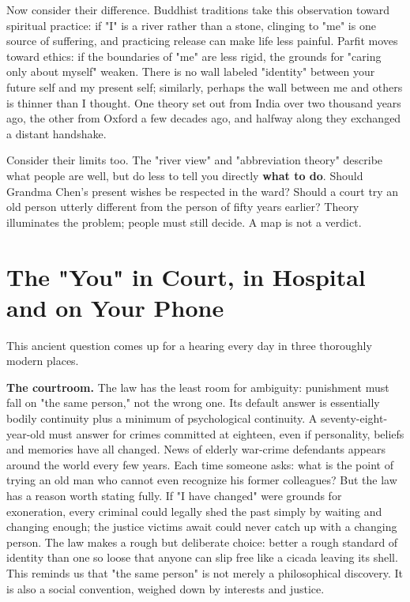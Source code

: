 Now consider their difference. Buddhist traditions take this observation toward spiritual practice: if "I" is a river rather than a stone, clinging to "me" is one source of suffering, and practicing release can make life less painful. Parfit moves toward ethics: if the boundaries of "me" are less rigid, the grounds for "caring only about myself" weaken. There is no wall labeled "identity" between your future self and my present self; similarly, perhaps the wall between me and others is thinner than I thought. One theory set out from India over two thousand years ago, the other from Oxford a few decades ago, and halfway along they exchanged a distant handshake.

Consider their limits too. The "river view" and "abbreviation theory" describe what people are well, but do less to tell you directly \textbf{what to do}. Should Grandma Chen's present wishes be respected in the ward? Should a court try an old person utterly different from the person of fifty years earlier? Theory illuminates the problem; people must still decide. A map is not a verdict.

\section[Yourself in Court, Ward and Phone]{The "You" in Court, in Hospital and on Your Phone}
This ancient question comes up for a hearing every day in three thoroughly modern places.

\textbf{The courtroom.} The law has the least room for ambiguity: punishment must fall on "the same person," not the wrong one. Its default answer is essentially bodily continuity plus a minimum of psychological continuity. A seventy-eight-year-old must answer for crimes committed at eighteen, even if personality, beliefs and memories have all changed. News of elderly war-crime defendants appears around the world every few years. Each time someone asks: what is the point of trying an old man who cannot even recognize his former colleagues? But the law has a reason worth stating fully. If "I have changed" were grounds for exoneration, every criminal could legally shed the past simply by waiting and changing enough; the justice victims await could never catch up with a changing person. The law makes a rough but deliberate choice: better a rough standard of identity than one so loose that anyone can slip free like a cicada leaving its shell. This reminds us that "the same person" is not merely a philosophical discovery. It is also a social convention, weighed down by interests and justice.

